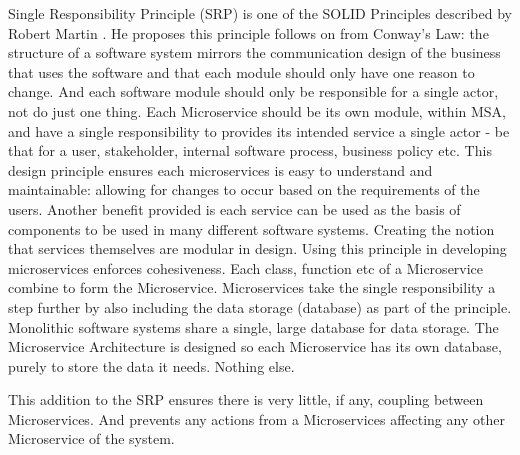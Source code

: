  Single Responsibility Principle (SRP) is one of the SOLID Principles described by Robert Martin \cite{RobMartCleanArchi}.
 He proposes this principle follows on from Conway's Law: the structure of a software system mirrors the communication design of the business that uses the software and that each module should only have one reason to change. And each software module should only be responsible for a single actor, not do just one thing.
 Each Microservice should be its own module, within MSA, and have a single responsibility to provides its intended service a single actor - be that for a user, stakeholder, internal software process, business policy etc. This design principle ensures each microservices is easy to understand and maintainable: allowing for changes to occur based on the requirements of the users. 
 Another benefit provided is each service can be used as the basis of components to be used in many different software systems. Creating the notion that services themselves are modular in design.
 Using this principle in developing microservices enforces cohesiveness. Each class, function etc of a Microservice combine to form the Microservice. 
 Microservices take the single responsibility a step further by also including the data storage (database) as part of the principle. Monolithic software systems share a single, large database for data storage. The Microservice Architecture is designed so each Microservice has its own database, purely to store the data it needs. Nothing else.
 
 This addition to the SRP ensures there is very little, if any, coupling between Microservices. And prevents any actions from a Microservices affecting any other Microservice of the system.
